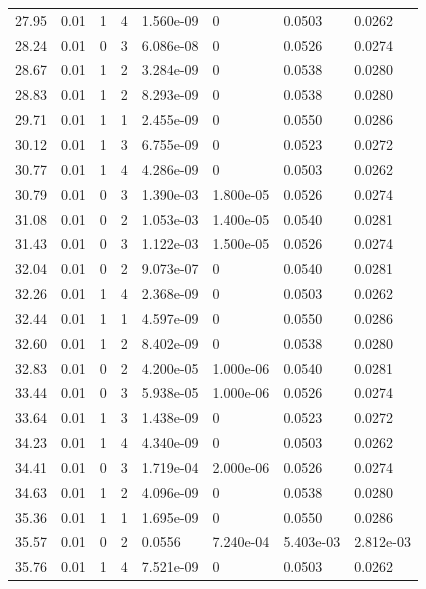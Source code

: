 \documentclass[preview]{standalone}
\begin{document}
{{{\begin{tabular}{L{1.2cm}C{1.2cm} C{0.3cm}C{0.5cm} C{1.4cm}C{1.4cm} C{1.4cm}C{1.4cm}}
  27.95  &  0.01  & 1     &  4 &  1.560e-09  & 0  & 0.0503 &  0.0262   \\ 
  28.24  &  0.01  & 0     &  3 &  6.086e-08  & 0  & 0.0526 &  0.0274   \\ 
  28.67  &  0.01  & 1     &  2 &  3.284e-09  & 0  & 0.0538 &  0.0280   \\ 
  28.83  &  0.01  & 1     &  2 &  8.293e-09  & 0  & 0.0538 &  0.0280   \\ 
  29.71  &  0.01  & 1     &  1 &  2.455e-09  & 0  & 0.0550 &  0.0286   \\ 
  30.12  &  0.01  & 1     &  3 &  6.755e-09  & 0  & 0.0523 &  0.0272   \\ 
  30.77  &  0.01  & 1     &  4 &  4.286e-09  & 0  & 0.0503 &  0.0262   \\ 
  30.79  &  0.01  & 0     &  3 &  1.390e-03  & 1.800e-05  & 0.0526 &  0.0274   \\ 
  31.08  &  0.01  & 0     &  2 &  1.053e-03  & 1.400e-05  & 0.0540 &  0.0281   \\ 
  31.43  &  0.01  & 0     &  3 &  1.122e-03  & 1.500e-05  & 0.0526 &  0.0274   \\ 
  32.04  &  0.01  & 0     &  2 &  9.073e-07  & 0  & 0.0540 &  0.0281   \\ 
  32.26  &  0.01  & 1     &  4 &  2.368e-09  & 0  & 0.0503 &  0.0262   \\ 
  32.44  &  0.01  & 1     &  1 &  4.597e-09  & 0  & 0.0550 &  0.0286   \\ 
  32.60  &  0.01  & 1     &  2 &  8.402e-09  & 0  & 0.0538 &  0.0280   \\ 
  32.83  &  0.01  & 0     &  2 &  4.200e-05  & 1.000e-06  & 0.0540 &  0.0281   \\ 
  33.44  &  0.01  & 0     &  3 &  5.938e-05  & 1.000e-06  & 0.0526 &  0.0274   \\ 
  33.64  &  0.01  & 1     &  3 &  1.438e-09  & 0  & 0.0523 &  0.0272   \\ 
  34.23  &  0.01  & 1     &  4 &  4.340e-09  & 0  & 0.0503 &  0.0262   \\ 
  34.41  &  0.01  & 0     &  3 &  1.719e-04  & 2.000e-06  & 0.0526 &  0.0274   \\ 
  34.63  &  0.01  & 1     &  2 &  4.096e-09  & 0  & 0.0538 &  0.0280   \\ 
  35.36  &  0.01  & 1     &  1 &  1.695e-09  & 0  & 0.0550 &  0.0286   \\ 
  35.57  &  0.01  & 0     &  2 &  0.0556  & 7.240e-04  & 5.403e-03 &  2.812e-03   \\ 
  35.76  &  0.01  & 1     &  4 &  7.521e-09  & 0  & 0.0503 &  0.0262   \\ 

\end{tabular}}}}
\end{document}
